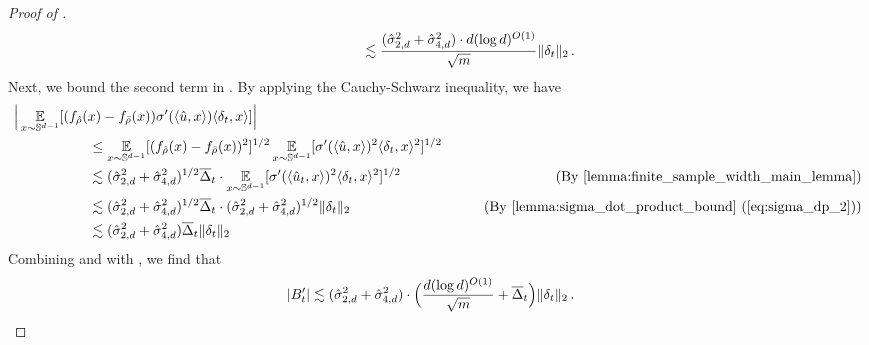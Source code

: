 \begin{proof}[Proof of ]
\begin{align}
& \,\,\,\,\,\,\,\,\,\,\,\,\,\,\,\,\,\,\,\,\,\,\,\,\,\,\,\,\,\,\,\, \lesssim \frac{(\hat{\sigma}_{2, d}^2 + \hat{\sigma}_{4, d}^2) \cdot d (\log d)^{O(1)}}{\sqrt{m}} \|\delta_t\|_2 \,. \label{eq:bt_2}
\end{align}
Next, we bound the second term in . By applying the Cauchy-Schwarz inequality, we have
\begin{align}
& \Big| \E_{x \sim \bbS^{d - 1}} [(f_{\rhohat}(x) - f_{\rhobar}(x)) \sigma'(\langle \uhat, x \rangle) \langle \delta_t, x \rangle] \Big| \\
& \nextlinespace\nextlinespace \leq \E_{x \sim \bbS^{d - 1}} [(f_{\rhohat}(x) - f_{\rhobar}(x))^2]^{1/2} \E_{x \sim \bbS^{d - 1}} [\sigma'(\langle \uhat, x \rangle)^2 \langle \vv_t, x \rangle^2]^{1/2} \\
& \nextlinespace\nextlinespace \lesssim (\sigmaCoeffTwo^2 + \sigmaCoeffFour^2)^{1/2} \deltaBar_t \cdot \E_{x \sim \bbS^{d - 1}} [\sigma'(\langle \uhat_t, x \rangle)^2 \langle \vv_t, x \rangle^2]^{1/2}
& \tag{By \Cref{lemma:finite_sample_width_main_lemma}} \\
& \nextlinespace\nextlinespace \lesssim (\sigmaCoeffTwo^2 + \sigmaCoeffFour^2)^{1/2} \deltaBar_t \cdot (\sigmaCoeffTwo^2 + \sigmaCoeffFour^2)^{1/2} \|\delta_t\|_2
& \tag{By \Cref{lemma:sigma_dot_product_bound} (\Cref{eq:sigma_dp_2})} \\
& \nextlinespace\nextlinespace \lesssim (\sigmaCoeffTwo^2 + \sigmaCoeffFour^2) \deltaBar_t \|\delta_t\|_2
\label{eq:bt_3}
\end{align}
Combining  and  with , we find that
\begin{align}
|B_t'|
& \lesssim (\hat{\sigma}_{2, d}^2 + \hat{\sigma}_{4, d}^2) \cdot \Big(\frac{d (\log d)^{O(1)}}{\sqrt{m}} + \overline{\Delta}_t\Big) \|\delta_t\|_2 \,.
\end{align}


\end{proof}
